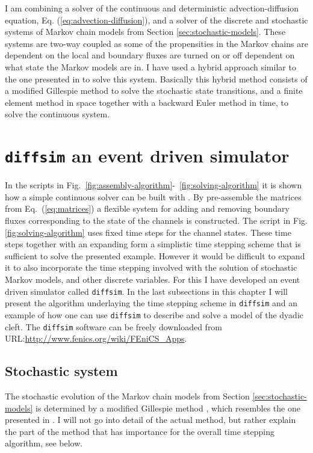 I am combining a solver of the continuous and deterministic advection-diffusion equation, Eq. (\ref{eq:advection-diffusion}), and a solver of the discrete and stochastic systems of Markov chain models from Section \ref{sec:stochastic-models}. These systems are two-way coupled as some of the propensities in the Markov chains are dependent on the local \CaC and boundary fluxes are turned on or off dependent on what state the Markov models are in. I have used a hybrid approach similar to the one presented in \cite{Ruedi_2007_1847} to solve this system. Basically this hybrid method consists of a modified Gillespie method \cite{Gill_1977_2340} to solve the stochastic state transitions, and a finite element method in space together with a backward Euler method in time, to solve the continuous system.\par

\section{\texttt{diffsim} an event driven simulator}
\label{sec:diffsim}
In the scripts in Fig.~\ref{fig:assembly-algorithm}-~\ref{fig:solving-algorithm} it is shown how a simple continuous solver can be built with \pydolfin. By pre-assemble the matrices from Eq.~(\ref{eq:matrices}) a flexible system for adding and removing boundary fluxes corresponding to the state of the channels is constructed. The script in Fig.\ref{fig:solving-algorithm} uses fixed time steps for the channel states. These time steps together with an expanding \Dt form a simplistic time stepping scheme that is sufficient to solve the presented example. However it would be difficult to expand it to also incorporate the time stepping involved with the solution of stochastic Markov models, and other discrete variables. For this I have developed an event driven simulator called \texttt{diffsim}. In the last subsections in this chapter I will present the algorithm underlaying the time stepping scheme in \texttt{diffsim} and an example of how one can use \texttt{diffsim} to describe and solve a model of the dyadic cleft. The \texttt{diffsim} software can be freely downloaded from URL:\url{http://www.fenics.org/wiki/FEniCS_Apps}.\par

\subsection{Stochastic system}
\label{sec:stochastic-system}
The stochastic evolution of the Markov chain models from Section \ref{sec:stochastic-models} is determined by a modified Gillespie method \cite{Gill_1977_2340}, which resembles the one presented in \cite{Ruedi_2007_1847}. I will not go into detail of the actual method, but rather explain the part of the method that has importance for the overall time stepping algorithm, see below.\par

